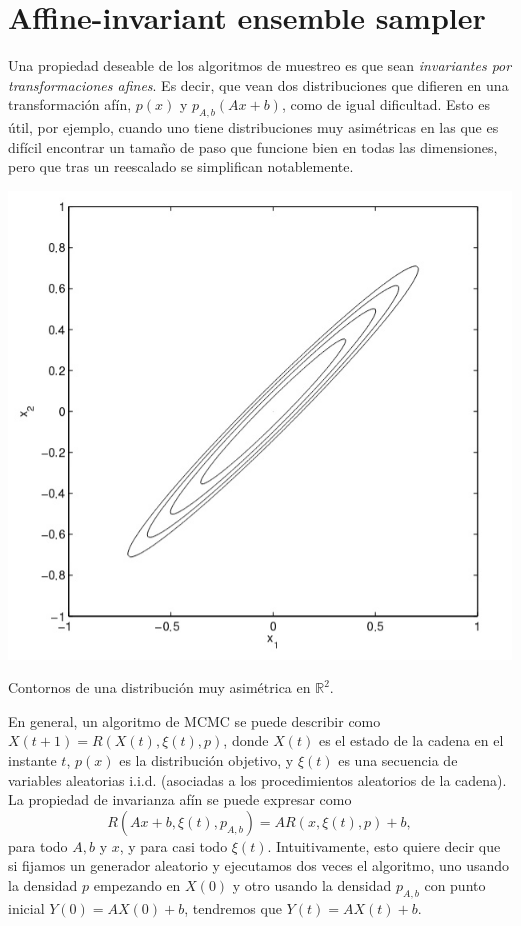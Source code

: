 \documentclass[
  a4paper,
	fontsize=11pt, %
	twoside=false, %
  secnumdepth=2,
	numbers=noenddot, %
]{kaohandt}
\newcommand{\R} {\ensuremath{\mathds{R}}}
\begin{document}
\section{Affine-invariant ensemble sampler}

Una propiedad deseable de los algoritmos de muestreo es que sean \textit{invariantes por transformaciones afines}. Es decir, que vean dos distribuciones que difieren en una transformación afín, \(p(x)\) y \(p_{A, b}(Ax + b)\), como de igual dificultad. Esto es útil, por ejemplo, cuando uno tiene distribuciones muy asimétricas en las que es difícil encontrar un tamaño de paso que funcione bien en todas las dimensiones, pero que tras un reescalado se simplifican notablemente.

\begin{marginfigure}[*-6]
  \centering
  \includegraphics[width=.9\textwidth]{img/skewed}
  \caption*{Contornos de una distribución muy asimétrica en \(\R^2\).}
\end{marginfigure}

En general, un algoritmo de MCMC se puede describir como \(X(t+1)=R(X(t), \xi(t), p)\), donde \(X(t)\) es el estado de la cadena en el instante \(t\), \(p(x)\) es la distribución objetivo, y \(\xi(t)\) es una secuencia de variables aleatorias i.i.d. (asociadas a los procedimientos aleatorios de la cadena). La propiedad de invarianza afín se puede expresar como
\[
R(Ax+b, \xi(t), p_{A,b}) = AR(x, \xi(t), p) + b,
\]
para todo \(A, b\) y \(x\), y para casi todo \(\xi(t)\). Intuitivamente, esto quiere decir que si fijamos un generador aleatorio y ejecutamos dos veces el algoritmo, uno usando la densidad \(p\) empezando en \(X(0)\) y otro usando la densidad \(p_{A,b}\) con punto inicial \(Y(0)=AX(0)+b\), tendremos que \(Y(t)=AX(t)+b\).
\end{document}
